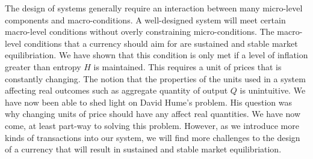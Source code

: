 The design of systems generally require an interaction between many micro-level components and
macro-conditions. A well-designed system will meet certain macro-level conditions without overly
constraining micro-conditions. The macro-level conditions that a currency should aim for are
sustained and stable market equilibriation. We have shown that this condition is only met if a
level of inflation greater than entropy $H$ is maintained. This requires a unit of prices that is
constantly changing. The notion that the properties of the units used in a system affecting real
outcomes such as aggregate quantity of output $Q$ is unintuitive. We have now been able to shed
light on David Hume's problem. His question was why changing units of price should have any affect
real quantities. We have now come, at least part-way to solving this problem. However, as we
introduce more kinds of transactions into our system, we will find more challenges to the design of
a currency that will result in sustained and stable market equilibriation.  
